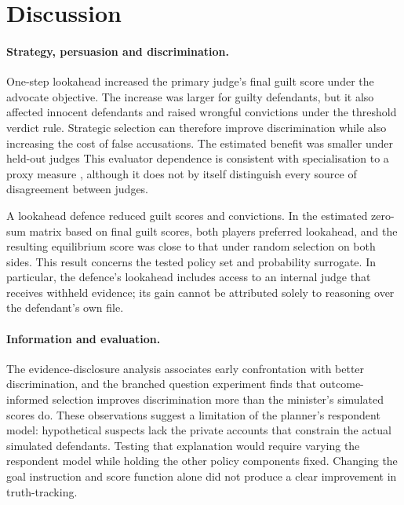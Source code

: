\section{Discussion}\label{sec:discussion}

\paragraph{Strategy, persuasion and discrimination.}
One-step lookahead increased the primary judge's final guilt score under the advocate objective. The increase was
larger for guilty defendants, but it also affected innocent defendants and raised wrongful convictions under the
threshold verdict rule. Strategic selection can therefore improve discrimination while also increasing the cost
of false accusations. The estimated benefit was smaller under held-out judges \StudyTwoTransferText{}
This evaluator dependence is consistent with specialisation to a proxy measure \citep{manheim2018,gao2023},
although it does not by itself distinguish every source of disagreement between judges.

A lookahead defence reduced guilt scores and convictions. In the estimated zero-sum matrix based on final guilt
scores, both players preferred lookahead, and the resulting equilibrium score was close to that under random
selection on both sides. This result concerns the tested policy set and probability surrogate. In particular, the
defence's lookahead includes access to an internal judge that receives withheld evidence; its gain cannot be
attributed solely to reasoning over the defendant's own file.

\paragraph{Information and evaluation.}
The evidence-disclosure analysis associates early confrontation with better discrimination, and the branched
question experiment finds that outcome-informed selection improves discrimination more than the minister's
simulated scores do. These observations suggest a limitation of the planner's respondent model: hypothetical
suspects lack the private accounts that constrain the actual simulated defendants. Testing that explanation
would require varying the respondent model while holding the other policy components fixed. Changing the goal
instruction and score function alone did not produce a clear improvement in truth-tracking.

